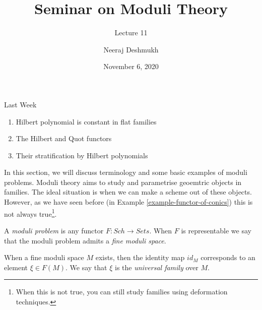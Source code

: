 \documentclass[ignorenonframetext,t]{beamer}
\title[Moduli@IISERP]{Seminar on Moduli Theory}
\subtitle{Lecture 11}
\author{Neeraj Deshmukh}
\date{November 6, 2020}
\theoremstyle{definition}
\begin{document}
	
	
\begin{frame}
\titlepage
\end{frame}

\begin{frame}{Last Week}
\begin{enumerate}
	\item Hilbert polynomial is constant in flat families
	\item The Hilbert and Quot functors
	\item Their stratification by Hilbert polynomials
\end{enumerate}
\end{frame}

In this section, we will discuss terminology and some basic examples of moduli problems. Moduli theory aims to study and parametrise geoemtric objects in families. The ideal situation is when we can make a scheme out of these objects. However, as we have seen before (in Example \ref{example-functor-of-conics}) this is not always true\footnote{When this is not true, you can still study families using deformation techniques.}.


\begin{frame}
\begin{definition}
	A \textit{moduli problem} is any functor $F: \mathit{Sch} \rightarrow \mathit{Sets}$. When $F$ is representable we say that the moduli problem admits a \textit{fine moduli space}.
\end{definition}

When a fine moduli space $M$ exists, then the identity map $id_M$ corresponds to an element $\xi \in F(M)$. We say that $\xi$ is the \textit{universal family} over $M$.

\end{frame}
\end{document}
